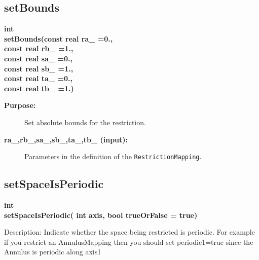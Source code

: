\subsection{setBounds}
 
\begin{flushleft} \textbf{%
int  \\ 
\settowidth{\RestrictionMappingIncludeArgIndent}{setBounds(}%
setBounds(const real ra\_ =0., \\ 
\hspace{\RestrictionMappingIncludeArgIndent}const real rb\_ =1., \\ 
\hspace{\RestrictionMappingIncludeArgIndent}const real sa\_ =0.,\\ 
\hspace{\RestrictionMappingIncludeArgIndent}const real sb\_ =1.,\\ 
\hspace{\RestrictionMappingIncludeArgIndent}const real ta\_ =0.,\\ 
\hspace{\RestrictionMappingIncludeArgIndent}const real tb\_   =1.)
}\end{flushleft}
\begin{description}
\item[{\bf Purpose:}]  
  Set absolute bounds for the restriction.
\item[{\bf ra\_,rb\_,sa\_,sb\_,ta\_,tb\_ (input):}]  Parameters in the definition of the 
   {\tt RestrictionMapping}.
\end{description}
\subsection{setSpaceIsPeriodic}
 
\begin{flushleft} \textbf{%
int  \\ 
\settowidth{\RestrictionMappingIncludeArgIndent}{setSpaceIsPeriodic(}%
setSpaceIsPeriodic( int axis, bool trueOrFalse  = true)
}\end{flushleft}
 Description:
    Indicate whether the space being restricted is periodic. For example if you
 restrict an AnnulusMapping then you should set periodic1=true since the Annulus
 is periodic along axis1
